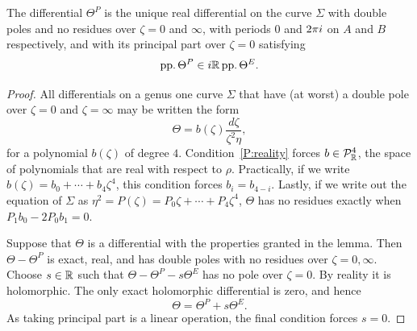 \documentclass{article}
\begin{document}
\begin{lem}
\label{lem:theta2_characterisation}
The differential $\Theta^P$ is the unique real differential on the curve $\Sigma$ with double poles and no residues over $\zeta=0$ and $\infty$, with periods $0$ and $2\pi i$ on $A$ and $B$ respectively, and with its principal part over $\zeta=0$ satisfying
\[
\operatorname{pp.} \Theta^P \in i \mathbb{R} \operatorname{pp.} \Theta^E.
\]
\begin{proof}
All differentials on a genus one curve $\Sigma$ that have (at worst) a double pole over $\zeta=0$ and $\zeta=\infty$ may be written the form
\[
\Theta = b(\zeta)\frac{d\zeta}{\zeta^2\eta},
\]
for a polynomial $b(\zeta)$ of degree $4$. Condition~\ref{P:reality} forces $b\in \mathcal{P}^4_{\mathbb{R}}$, the space of polynomials that are real with respect to $\rho$. Practically, if we write $b(\zeta) = b_0 + \cdots + b_4 \zeta^4$, this condition forces $b_i = b_{4-i}$. Lastly, if we write out the equation of $\Sigma$ as $\eta^2 = P(\zeta) = P_0 \zeta + \cdots + P_4 \zeta^4$, $\Theta$ has no residues exactly when $P_1b_0 - 2P_0b_1 = 0$. 

Suppose that $\Theta$ is a differential with the properties granted in the lemma. Then $\Theta-\Theta^P$ is exact, real, and has double poles with no residues over $\zeta = 0,\infty$. Choose $s\in\mathbb{R}$ such that $\Theta-\Theta^P - s\Theta^E$ has no pole over $\zeta = 0$. By reality it is holomorphic. The only exact holomorphic differential is zero, and hence
\[
\Theta = \Theta^P + s \Theta^E.
\]
As taking principal part is a linear operation, the final condition forces $s=0$.
\end{proof}
\end{lem}
\end{document}
